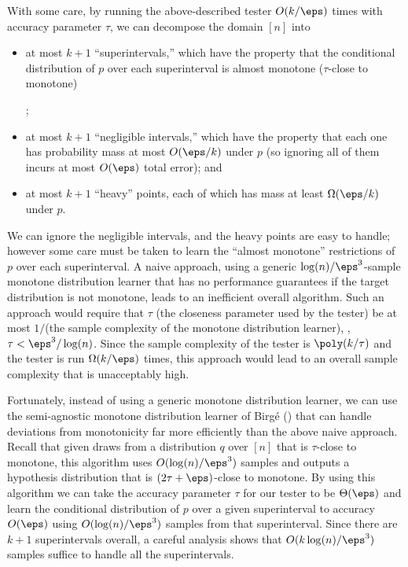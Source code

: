 With some care, by running the above-described tester $O(k/\eps)$ times with accuracy parameter $\tau$,
we can decompose the domain $[n]$ into

%

\begin{itemize}

\item at most $k+1$ ``superintervals,'' which have the property that the conditional distribution of
$p$ over each superinterval is almost monotone ($\tau$-close to monotone)\ignore{
};

%

\item at most $k+1$ ``negligible intervals,'' which have the property that each one has
probability mass at most $O(\eps/k)$ under $p$ (so ignoring all of them incurs at most $O(\eps)$ total
error); and

%

\item at most $k+1$ ``heavy'' points, each of which has mass at least $\Omega(\eps/k)$ under $p$.

\end{itemize}

%

\noindent
We can ignore the negligible intervals, and the heavy points are easy to handle; however some care must be taken to learn the ``almost monotone''
restrictions of $p$ over each superinterval.  A naive approach, using a generic
$\log(n)/\eps^3$-sample monotone distribution learner that has no performance guarantees if the target
distribution is not monotone, leads to an inefficient overall algorithm.  Such an approach
would require that $\tau$ (the closeness parameter used by the tester) be at most $1/$(the sample complexity
of the monotone distribution learner), \ie, $\tau < \eps^3/\log(n)$.  Since the sample
complexity of the tester is $\poly(k/\tau)$ and the tester is run $\Omega(k/\eps)$ times, this approach would lead
to an overall sample complexity that is unacceptably high.

Fortunately, instead of using a generic monotone distribution learner, we
can use the semi-agnostic monotone distribution learner of Birg\'{e}
() that can handle
deviations from monotonicity far more efficiently than the above naive
approach.  Recall that given draws from a distribution
$q$ over $[n]$ that is $\tau$-close to monotone, this algorithm uses
$O(\log(n)/\eps^3)$ samples and outputs a hypothesis distribution that is
$(2\tau + \eps)$-close to monotone.  By using
this algorithm we can take the accuracy parameter $\tau$ for our tester to be $\Theta(\eps)$ and learn
the conditional distribution of $p$ over a given superinterval
to accuracy $O(\eps)$ using $O(\log(n)/\eps^3)$ samples from that
superinterval. Since there are $k+1$ superintervals overall, a careful analysis shows that
$O(k \log(n)/\eps^3)$ samples suffice to handle all the superintervals.


